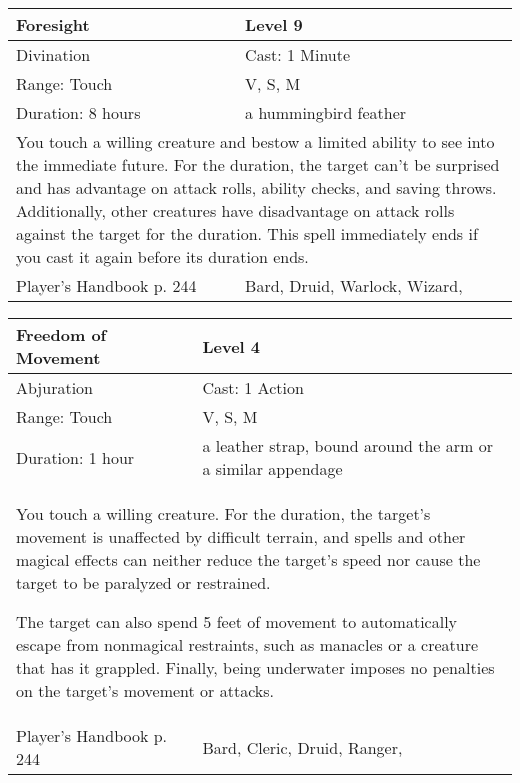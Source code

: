 \documentclass[11pt]{report}
\begin{document}
\begin{table}[H]
	\begin{tabular}{||p{6cm}|p{6cm}||}
		\hline\hline
		\bf{Foresight} & Level 9\\ \hline
		Divination & Cast: 1 Minute\\ \hline
		Range: Touch & V, S, M\\ \hline
		Duration: 8 hours & a hummingbird feather\\ \hline
		\multicolumn{2}{||p{12cm}||}{You touch a willing creature and bestow a limited ability to see into the immediate future. For the duration, the target can’t be surprised and has advantage on attack rolls, ability checks, and saving throws. Additionally, other creatures have disadvantage on attack rolls against the target for the duration.
This spell immediately ends if you cast it again before its duration ends.}\\ \hline
Player's Handbook p. 244 & Bard, Druid, Warlock, Wizard, \\ \hline\hline
	\end{tabular}
\end{table}

\begin{table}[H]
	\begin{tabular}{||p{6cm}|p{6cm}||}
		\hline\hline
		\bf{Freedom of Movement} & Level 4\\ \hline
		Abjuration & Cast: 1 Action\\ \hline
		Range: Touch & V, S, M\\ \hline
		Duration: 1 hour & a leather strap, bound around the arm or a similar appendage\\ \hline
		\multicolumn{2}{||p{12cm}||}{You touch a willing creature. For the duration, the target’s movement is unaffected by difficult terrain, and spells and other magical effects can neither reduce the target’s speed nor cause the target to be paralyzed or restrained.

The target can also spend 5 feet of movement to automatically escape from nonmagical restraints, such as manacles or a creature that has it grappled. Finally, being underwater imposes no penalties on the target’s movement or attacks.}\\ \hline
Player's Handbook p. 244 & Bard, Cleric, Druid, Ranger, \\ \hline\hline
	\end{tabular}
\end{table}
\end{document}
